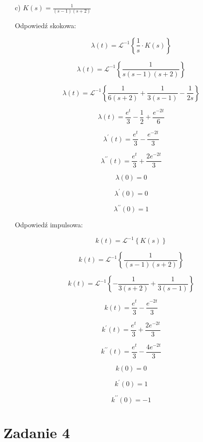 \documentclass{article}
\begin{document}
\begin{enumerate}
    \newpage


    \item[c)]  $K(s)=\frac{1}{\left(s - 1\right) \left(s + 2\right)}$

    Odpowiedź skokowa:

    $$ \lambda(t)=\mathcal{L}^{-1}\left\{\frac{1}{s}\cdot K(s)\right\} $$

    $$ \lambda(t)=\mathcal{L}^{-1}\left\{\frac{1}{s \left(s - 1\right) \left(s + 2\right)}\right\} $$

    $$ \lambda(t)=\mathcal{L}^{-1}\left\{\frac{1}{6 \left(s + 2\right)} + \frac{1}{3 \left(s - 1\right)} - \frac{1}{2 s}\right\}$$

    $$ \lambda(t)=\frac{e^{t}}{3} - \frac{1}{2} + \frac{e^{- 2 t}}{6}$$

    $$ \lambda^{\prime}(t)=\frac{e^{t}}{3} - \frac{e^{- 2 t}}{3}$$

    $$ \lambda^{\prime\prime}(t)=\frac{e^{t}}{3} + \frac{2 e^{- 2 t}}{3}$$

    $$ \lambda(0)=0 $$

    $$ \lambda^{\prime}(0)=0$$

    $$ \lambda^{\prime\prime}(0)=1$$

    \newpage

    Odpowiedź impulsowa:

    $$ k(t)=\mathcal{L}^{-1}\left\{K(s)\right\} $$

    $$ k(t)=\mathcal{L}^{-1}\left\{\frac{1}{\left(s - 1\right) \left(s + 2\right)}\right\} $$

    $$ k(t)=\mathcal{L}^{-1}\left\{- \frac{1}{3 \left(s + 2\right)} + \frac{1}{3 \left(s - 1\right)}\right\} $$

    $$ k(t)=\frac{e^{t}}{3} - \frac{e^{- 2 t}}{3}$$

    $$ k^{\prime}(t)=\frac{e^{t}}{3} + \frac{2 e^{- 2 t}}{3}$$

    $$ k^{\prime\prime}(t)=\frac{e^{t}}{3} - \frac{4 e^{- 2 t}}{3}$$

    $$ k(0)=0$$

    $$ k^{\prime}(0)=1$$

    $$ k^{\prime\prime}(0)=-1$$
\end{enumerate}

\newpage


\section*{Zadanie 4}
\end{document}
